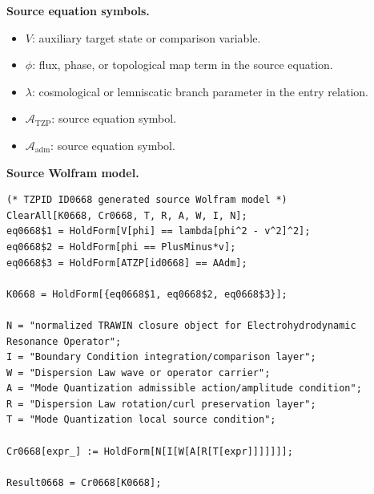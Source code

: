 \begin{minipage}[t]{0.49\linewidth}
\begingroup
\small
\raggedright
\textbf{Source equation symbols.}\par
\begin{itemize}[leftmargin=1.35em,itemsep=1pt,topsep=1pt,parsep=0pt]
    \item $V$: auxiliary target state or comparison variable.
    \item $\phi$: flux, phase, or topological map term in the source equation.
    \item $\lambda$: cosmological or lemniscatic branch parameter in the entry relation.
    \item $\mathcal{A}_{\mathrm{TZP}}$: source equation symbol.
    \item $\mathcal{A}_{\mathrm{adm}}$: source equation symbol.
\end{itemize}
\endgroup
\end{minipage}\hfill
\begin{minipage}[t]{0.47\linewidth}
\begingroup
\scriptsize
\raggedright
\textbf{Source Wolfram model.}\par
\begin{Verbatim}[fontsize=\tiny,breaklines=true,breakanywhere=true]
(* TZPID ID0668 generated source Wolfram model *)
ClearAll[K0668, Cr0668, T, R, A, W, I, N];
eq0668$1 = HoldForm[V[phi] == lambda[phi^2 - v^2]^2];
eq0668$2 = HoldForm[phi == PlusMinus*v];
eq0668$3 = HoldForm[ATZP[id0668] == AAdm];

K0668 = HoldForm[{eq0668$1, eq0668$2, eq0668$3}];

N = "normalized TRAWIN closure object for Electrohydrodynamic Resonance Operator";
I = "Boundary Condition integration/comparison layer";
W = "Dispersion Law wave or operator carrier";
A = "Mode Quantization admissible action/amplitude condition";
R = "Dispersion Law rotation/curl preservation layer";
T = "Mode Quantization local source condition";

Cr0668[expr_] := HoldForm[N[I[W[A[R[T[expr]]]]]]];

Result0668 = Cr0668[K0668];
\end{Verbatim}
\endgroup
\end{minipage}

